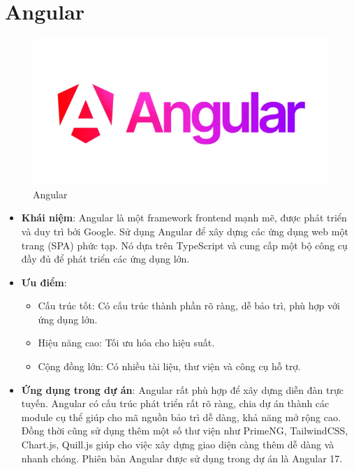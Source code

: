 \documentclass[../index.tex]{subfiles}
\begin{document}
    \section{Angular}
    \begin{figure}[H]
        \centering
        \includegraphics[width=0.4\linewidth]{figures/tech-logo/angular.png}
        \caption{Angular}
        \label{tech:angular}
    \end{figure}
    \begin{itemize}
        \item \textbf{Khái niệm}: Angular là một framework frontend mạnh mẽ,
            được phát triển và duy trì bởi Google. Sử dụng Angular để xây dựng các
            ứng dụng web một trang (SPA) phức tạp. Nó dựa trên TypeScript và
            cung cấp một bộ công cụ đầy đủ để phát triển các ứng dụng lớn.

        \item \textbf{Ưu điểm}:
            \begin{itemize}
                \item Cấu trúc tốt: Có cấu trúc thành phần rõ ràng, dễ bảo trì,
                    phù hợp với ứng dụng lớn.

                \item Hiệu năng cao: Tối ưu hóa cho hiệu suất.

                \item Cộng đồng lớn: Có nhiều tài liệu, thư viện và công cụ hỗ trợ.
            \end{itemize}

        \item \textbf{Ứng dụng trong dự án}: Angular rất phù hợp để xây dựng diễn
            đàn trực tuyến. Angular có cấu trúc phát triển rất rõ ràng, chia dự án
            thành các module cụ thể giúp cho mã nguồn bảo trì dễ dàng, khả năng
            mở rộng cao. Đồng thời cũng sử dụng thêm một số thư viện như PrimeNG,
            TailwindCSS, Chart.js, Quill.js giúp cho việc xây dựng giao diện
            càng thêm dễ dàng và nhanh chóng. Phiên bản Angular được sử dụng trong
            dự án là Angular 17.
    \end{itemize}

\end{document}
